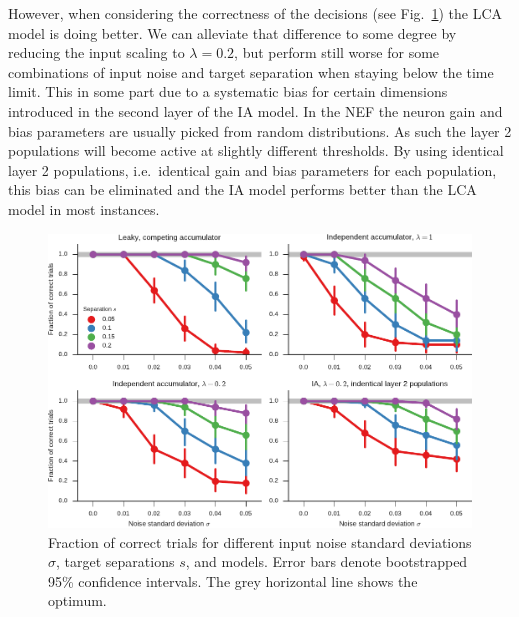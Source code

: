 \documentclass[10pt,letterpaper]{article}
\begin{document}
However, when considering the correctness of the decisions (see 
Fig.~\ref{fig:correct}) the LCA model is doing better. We can alleviate that 
difference to some degree by reducing the input scaling to $\lambda = 0.2$, but 
perform still worse for some combinations of input noise and target separation 
when staying below the time limit. This in some part due to a systematic bias 
for certain dimensions introduced in the second layer of the IA model. In the 
NEF the neuron gain and bias parameters are usually picked from random 
distributions. As such the layer 2 populations will become active at slightly 
different thresholds. By using identical layer 2 populations, i.e.~identical 
gain and bias parameters for each population, this bias can be eliminated and 
the IA model performs better than the LCA model in most instances.
\begin{figure}
    \centering
    \includegraphics{figures/correct}
    \caption{Fraction of correct trials for different input noise standard 
        deviations $\sigma$, target separations $s$, and models.  Error bars 
        denote bootstrapped 95\% confidence intervals. The grey horizontal line 
        shows the optimum.}\label{fig:correct}
\end{figure}
\end{document}

